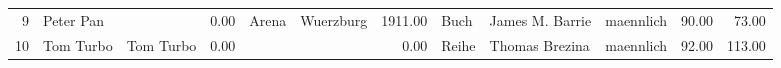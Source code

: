 \begin{table}
\begin{center}
{\begin{tabular}{rllrllrlllrr}
  9 & Peter Pan                                                                                                                                                                                                                                                       &                                                                                                                                                                                                                                                                 & 0.00 & Arena                                                                                                                                                                                                                                                           & Wuerzburg                                                                                                                                                                                                                                                       & 1911.00 & Buch & James M. Barrie                                                                                                                                                                                                                                                 & maennlich & 90.00 & 73.00 \\ 
  10 & Tom Turbo                                                                                                                                                                                                                                                       & Tom Turbo                                                                                                                                                                                                                                                       & 0.00 &                                                                                                                                                                                                                                                                 &                                                                                                                                                                                                                                                                 & 0.00 & Reihe & Thomas Brezina                                                                                                                                                                                                                                                  & maennlich & 92.00 & 113.00 \\ 

\end{tabular}}
\end{center}
\end{table}
